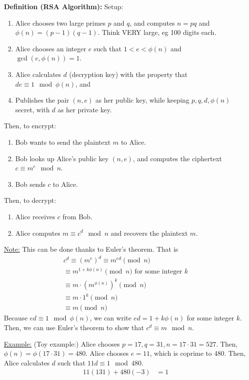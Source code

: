 \documentclass{article}
\begin{document}
\textbf{Definition (RSA Algorithm):} Setup:\begin{enumerate}
    \item Alice chooses two large primes $p$ and $q$, and computes $n=pq$ and $\phi(n)=(p-1)(q-1)$. Think VERY large, eg 100 digits each.
    \item Alice chooses an integer $e$ such that $1<e<\phi(n)$ and $\gcd(e,\phi(n))=1$. 
    \item Alice calculates $d$ (decryption key) with the property that $de\equiv 1\mod \phi(n)$, and 
    \item Publishes the pair $(n,e)$ as her public key, while keeping $p, q, d, \phi(n)$ secret, with $d$ as her private key.
\end{enumerate}Then, to encrypt:\begin{enumerate}
    \item Bob wants to send the plaintext $m$ to Alice.
    \item Bob looks up Alice's public key $(n,e)$, and computes the ciphertext $c\equiv m^e\mod n$.
    \item Bob sends $c$ to Alice.
\end{enumerate}Then, to decrypt:\begin{enumerate}
    \item Alice receives $c$ from Bob.
    \item Alice computes $m\equiv c^d\mod n$ and recovers the plaintext $m$.
\end{enumerate}

\underline{Note:} This can be done thanks to Euler's theorem. That is \begin{align*}
    c^d\equiv (m^e)^d\equiv m^{ed}\pmod{n}\\
    \equiv m^{1+k\phi(n)}\pmod{n}\text{ for some integer } k\\
    \equiv m\cdot (m^{\phi(n)})^k\pmod{n}\\
    \equiv m\cdot 1^k\pmod{n}\\
    \equiv m\pmod{n}
\end{align*}Because $ed\equiv 1\mod \phi(n)$, we can write $ed=1+k\phi(n)$ for some integer $k$. Then, we can use Euler's theorem to show that $c^d\equiv m\mod n$.

\underline{Example:} (Toy example:) Alice chooses $p=17, q=31, n=17\cdot 31=527$. Then, $\phi(n)=\phi(17\cdot 31)=480$. Alice chooses $e=11$, which is coprime to 480. Then, Alice calculates $d$ such that $11d\equiv 1\mod 480$. \begin{align*}
    11(131)+480(-3)&=1
\end{align*}
\end{document}
